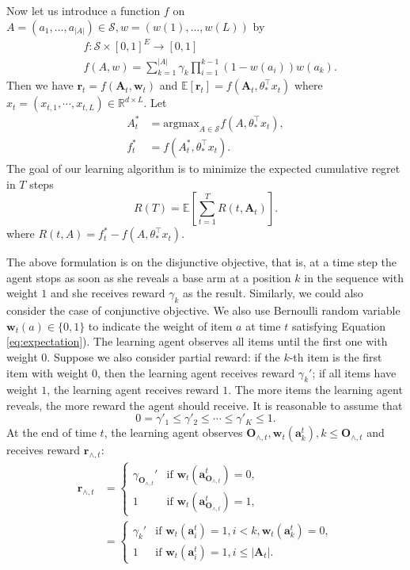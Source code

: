 \documentclass{article}
\newcommand{\EE}{\mathbb{E}}
\newcommand{\RR}{\mathbb{R}}
\newcommand{\bA}{\mathbf{A}}
\newcommand{\ba}{\mathbf{a}}
\newcommand{\bO}{\mathbf{O}}
\newcommand{\br}{\mathbf{r}}
\newcommand{\bw}{\mathbf{w}}
\newcommand{\cS}{\mathcal{S}}
\newcommand{\argmax}{\mathrm{argmax}}
\newcommand{\abs}[1]{\left| #1 \right|}
\begin{document}
Now let us introduce a function $f$ on $A = (a_1,...,a_{\abs{A}}) \in \cS, w = (w(1),...,w(L))$ by
\begin{align}
&f : \cS \times [0,1]^E \to [0,1] \nonumber \\
&f(A,w) = \sum_{k = 1}^{\abs{A}} \gamma_{k} \prod_{i=1}^{k-1} (1 - w(a_i)) w(a_k).
	\label{eq:functionf}
\end{align}
Then we have $\br_t = f(\bA_t, \bw_t)$ and $\EE[\br_t] = f(\bA_t, \theta_{\ast}^{\top}x_t)$ where $x_t = (x_{t,1}, \cdots, x_{t,L}) \in \RR^{d \times L}$. Let 
\begin{align*}
A_t^{\ast} &= \argmax_{A\in \cS} f(A,\theta_{\ast}^{\top}x_t),\\
f_t^{\ast} &= f(A_t^{\ast}, \theta_{\ast}^{\top}x_t).
\end{align*}
The goal of our learning algorithm is to minimize the expected cumulative regret in $T$ steps
$$
R(T) = \EE\left[\sum_{t=1}^T R(t, \bA_t)\right].
$$
where $R(t, A) = f_t^{\ast} - f(A, \theta_{\ast}^{\top}x_t)$.

The above formulation is on the disjunctive objective, that is, at a time step the agent stops as soon as she reveals a base arm at a position $k$ in the sequence with weight $1$ and she receives reward $\gamma_k$ as the result. Similarly, we could also consider the case of conjunctive objective. We also use Bernoulli random variable $\bw_{t}(a) \in \{0,1\}$ to indicate the weight of item $a$ at time $t$ satisfying Equation \eqref{eq:expectation}). The learning agent observes all items until the first one with weight $0$. Suppose we also consider partial reward: if the $k$-th item is the first item with weight $0$, then the learning agent receives reward $\gamma_k'$; if all items have weight $1$, the learning agent receives reward $1$. The more items the learning agent reveals, the more reward the agent should receive. It is reasonable to assume that
$$
0 = \gamma'_1 \leq \gamma'_2 \leq \cdots \leq \gamma'_K \leq 1.
$$
At the end of time $t$, the learning agent observes $\bO_{\wedge, t}, \bw_t(\ba_k^t), k \leq \bO_{\wedge, t}$ and receives reward
	$\br_{\wedge, t}$:
\begin{align*}
\br_{\wedge, t} &= \begin{cases}
\gamma_{\bO_{\wedge, t}}'  &\text{if } \bw_t(\ba_{\bO_{\wedge, t}}^t) = 0,\\
1 &\text{if } \bw_t(\ba_{\bO_{\wedge, t}}^t) = 1,
\end{cases}\\
&=\begin{cases}
\gamma_{k}'  &\text{if } \bw_t(\ba_{i}^t) = 1, i < k, \bw_t(\ba_{k}^t) = 0,\\
1 &\text{if } \bw_t(\ba_{i}^t) = 1, i\leq \abs{\bA_t}.
\end{cases}
\end{align*}
\end{document}
